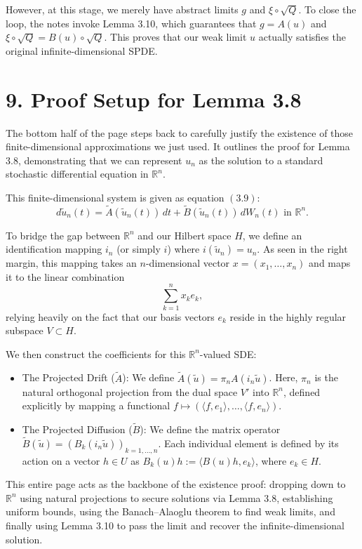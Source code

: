 \documentclass[11pt]{article}
\theoremstyle{definition}
\theoremstyle{remark}
\begin{document}
However, at this stage, we merely have abstract limits $g$ and $\xi \circ \sqrt{Q}$. To close the loop, the notes invoke Lemma 3.10, which guarantees that $g=A(u)$ and $\xi \circ \sqrt{Q}=B(u)\circ \sqrt{Q}$. This proves that our weak limit $u$ actually satisfies the original infinite-dimensional SPDE.

\section*{9. Proof Setup for Lemma 3.8}
The bottom half of the page steps back to carefully justify the existence of those finite-dimensional approximations we just used. It outlines the proof for Lemma 3.8, demonstrating that we can represent $u_n$ as the solution to a standard stochastic differential equation in $\mathbb{R}^n$.

This finite-dimensional system is given as equation $(3.9)$:
\[
  d\tilde u_n(t) = \tilde A(\tilde u_n(t))\,dt + \tilde B(\tilde u_n(t))\,dW_n(t) \text{ in } \mathbb{R}^n.
\]

To bridge the gap between $\mathbb{R}^n$ and our Hilbert space $H$, we define an identification mapping $i_n$ (or simply $i$) where $i(\tilde u_n)=u_n$. As seen in the right margin, this mapping takes an $n$-dimensional vector $x=(x_1,\dots,x_n)$ and maps it to the linear combination
\[
  \sum_{k=1}^n x_k e_k,
\]
relying heavily on the fact that our basis vectors $e_k$ reside in the highly regular subspace $V \subset H$.

We then construct the coefficients for this $\mathbb{R}^n$-valued SDE:
\begin{itemize}
\item The Projected Drift ($\tilde A$): We define $\tilde A(\tilde u)=\pi_n A(i_n \tilde u)$. Here, $\pi_n$ is the natural orthogonal projection from the dual space $V'$ into $\mathbb{R}^n$, defined explicitly by mapping a functional $f \mapsto (\langle f,e_1 \rangle,\dots,\langle f,e_n \rangle)$.
\item The Projected Diffusion ($\tilde B$): We define the matrix operator $\tilde B(\tilde u)=(B_k(i_n \tilde u))_{k=1,\dots,n}$. Each individual element is defined by its action on a vector $h\in U$ as $B_k(u)h:=\langle B(u)h,e_k \rangle$, where $e_k\in H$.
\end{itemize}

This entire page acts as the backbone of the existence proof: dropping down to $\mathbb{R}^n$ using natural projections to secure solutions via Lemma 3.8, establishing uniform bounds, using the Banach--Alaoglu theorem to find weak limits, and finally using Lemma 3.10 to pass the limit and recover the infinite-dimensional solution.
\end{document}
